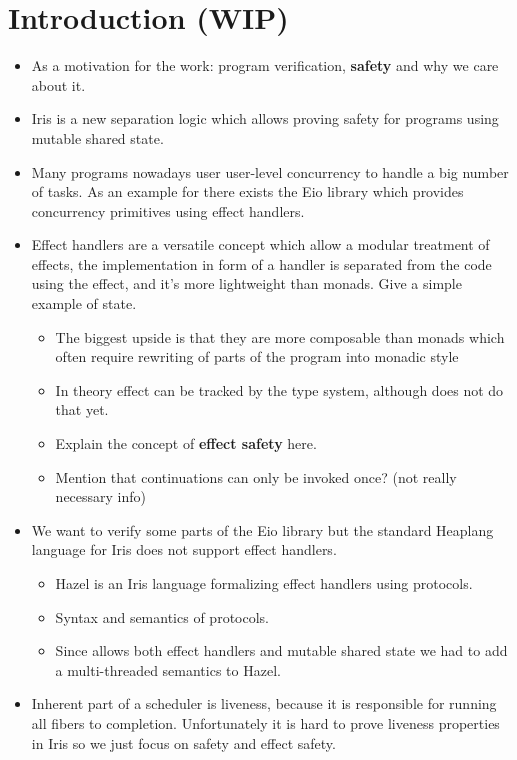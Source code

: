 \section{Introduction (WIP)}
\label{sec:introduction}

\begin{itemize}
    \item As a motivation for the work: program verification, \textbf{safety} and why we care about it.
    \item Iris is a new separation logic which allows proving safety for programs using mutable shared state.
    \item Many programs nowadays user user-level concurrency to handle a big number of tasks. As an example for \ocf{} there exists the Eio library which provides concurrency primitives using effect handlers.
    \item Effect handlers are a versatile concept which allow a modular treatment of effects, the implementation in form of a handler is separated from the code using the effect, and it's more lightweight than monads. Give a simple example of state.
          \begin{itemize}
              \item The biggest upside is that they are more composable than monads which often require rewriting of parts of the program into monadic style
              \item In theory effect can be tracked by the type system, although \ocf{} does not do that yet.
              \item Explain the concept of \textbf{effect safety} here.
              \item Mention that continuations can only be invoked once? (not really necessary info)
          \end{itemize}
    \item We want to verify some parts of the Eio library but the standard Heaplang language for Iris does not support effect handlers.
          \begin{itemize}
              \item Hazel is an Iris language formalizing effect handlers using protocols.
              \item Syntax and semantics of protocols.
              \item Since \ocf{} allows both effect handlers and mutable shared state we had to add a multi-threaded semantics to Hazel.
          \end{itemize}
    \item Inherent part of a scheduler is liveness, because it is responsible for running all fibers to completion. Unfortunately it is hard to prove liveness properties in Iris so we just focus on safety and effect safety.
\end{itemize}

